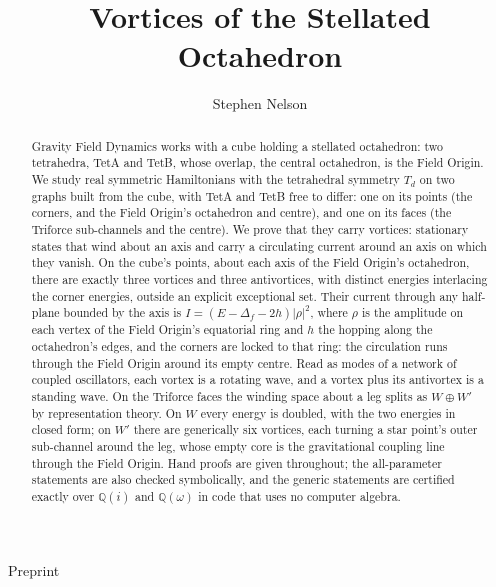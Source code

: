 \documentclass[twocolumn]{iopjournal}
\renewcommand{\articletype}[1]{%
  {\vspace*{-8mm}\noindent \Large \sf Preprint}\par
  \vspace*{6mm}\noindent{\scriptsize \sf{\bfseries \MakeUppercase{#1}}}}
\theoremstyle{definition}
\theoremstyle{remark}
\begin{document}
\articletype{Proof}

\title{Vortices of the Stellated Octahedron}

\author{Stephen Nelson}



\begin{abstract}
Gravity Field Dynamics works with a cube holding a stellated
octahedron: two tetrahedra, TetA and TetB, whose overlap, the central
octahedron, is the Field Origin. We study real symmetric Hamiltonians
with the tetrahedral symmetry $T_d$ on two graphs built from the cube,
with TetA and TetB free to differ: one on its points (the corners, and
the Field Origin's octahedron and centre), and one on its faces (the
Triforce sub-channels and the centre). We prove that they carry vortices: stationary states
that wind about an axis and carry a circulating current around an
axis on which they vanish. On the cube's points, about each axis of the
Field Origin's octahedron,
there are exactly three vortices and three antivortices, with distinct
energies interlacing the corner energies, outside an explicit
exceptional set. Their current through any half-plane bounded by the
axis is $I = (E - \Delta_f - 2h)\lvert\rho\rvert^2$, where $\rho$ is
the amplitude on each vertex of the Field Origin's equatorial ring and
$h$ the hopping along the octahedron's edges, and the corners are
locked to that ring: the circulation runs through the Field Origin
around its empty centre. Read as modes of a network of coupled
oscillators, each vortex is a rotating wave, and a vortex plus its
antivortex is a standing wave. On the Triforce faces the winding space
about a leg splits as $W \oplus W'$ by representation theory. On $W$
every energy is doubled, with the two energies in closed form; on $W'$
there are generically six vortices, each turning a star point's outer
sub-channel around the leg, whose empty core is the gravitational
coupling line through the Field Origin. Hand proofs are given throughout;
the all-parameter statements are also checked symbolically, and the
generic statements are certified exactly over $\mathbb Q(i)$ and
$\mathbb Q(\omega)$ in code that uses no computer algebra.
\end{abstract}


\end{document}

